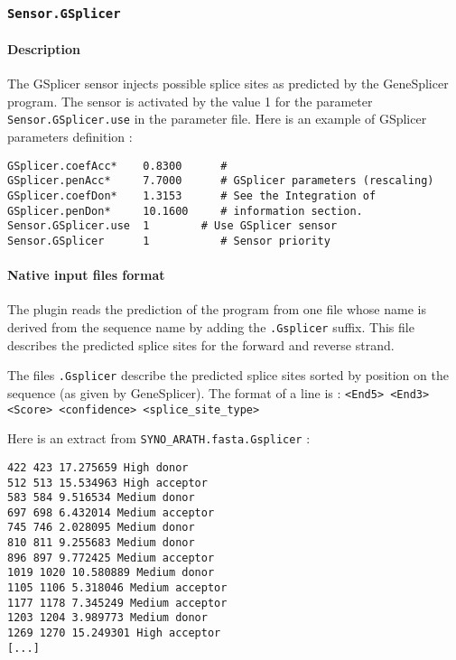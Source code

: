 
\subsubsection{\texttt{Sensor.GSplicer}}

\paragraph{Description}

The GSplicer sensor injects possible splice sites as predicted by the
GeneSplicer program. The sensor is
activated by the value 1 for the parameter
\texttt{Sensor.GSplicer.use} in the parameter file.  Here is an
example of GSplicer parameters definition :
\begin{Verbatim}[fontsize=\small]
GSplicer.coefAcc*    0.8300      #
GSplicer.penAcc*     7.7000      # GSplicer parameters (rescaling)
GSplicer.coefDon*    1.3153      # See the Integration of
GSplicer.penDon*     10.1600     # information section.
Sensor.GSplicer.use  1        # Use GSplicer sensor
Sensor.GSplicer      1           # Sensor priority
\end{Verbatim}

\paragraph{Native input files format}
The plugin reads the prediction of the
program from one file whose name is derived from the sequence name by
adding the \texttt{.Gsplicer} suffix. This file describes the predicted
splice sites for the forward and reverse strand.

The files \texttt{.Gsplicer} describe the predicted splice sites
sorted by position on the sequence (as given by GeneSplicer).
The format of a line is : \texttt{<End5> <End3> <Score> <confidence>
  <splice\_site\_type>}

Here is an extract from \texttt{SYNO\_ARATH.fasta.Gsplicer} :
\begin{Verbatim}[fontsize=\small]
422 423 17.275659 High donor
512 513 15.534963 High acceptor
583 584 9.516534 Medium donor
697 698 6.432014 Medium acceptor
745 746 2.028095 Medium donor
810 811 9.255683 Medium donor
896 897 9.772425 Medium acceptor
1019 1020 10.580889 Medium donor
1105 1106 5.318046 Medium acceptor
1177 1178 7.345249 Medium acceptor
1203 1204 3.989773 Medium donor
1269 1270 15.249301 High acceptor
[...]
\end{Verbatim}

